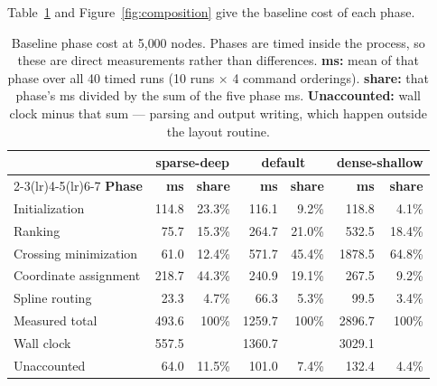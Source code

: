 Table~\ref{tab:composition} and Figure~\ref{fig:composition} give the baseline
cost of each phase.

\begin{table}[htbp]
\centering
\caption{Baseline phase cost at 5{,}000 nodes. Phases are timed inside the
process, so these are direct measurements rather than differences. \textbf{ms:}
mean of that phase over all 40 timed runs (10 runs $\times$ 4 command
orderings). \textbf{share:} that phase's ms divided by the sum of the five phase
ms. \textbf{Unaccounted:} wall clock minus that sum --- parsing and output
writing, which happen outside the layout routine.}
\label{tab:composition}
\begin{tabular}{lrrrrrr}
\toprule
& \multicolumn{2}{c}{\textbf{sparse-deep}} & \multicolumn{2}{c}{\textbf{default}} & \multicolumn{2}{c}{\textbf{dense-shallow}} \\
\cmidrule(lr){2-3}\cmidrule(lr){4-5}\cmidrule(lr){6-7}
\textbf{Phase} & \textbf{ms} & \textbf{share} & \textbf{ms} & \textbf{share} & \textbf{ms} & \textbf{share} \\
\midrule
Initialization        & 114.8  & 23.3\% & 116.1  & 9.2\%  & 118.8  & 4.1\%  \\
Ranking               & 75.7   & 15.3\% & 264.7  & 21.0\% & 532.5  & 18.4\% \\
Crossing minimization & 61.0   & 12.4\% & 571.7  & 45.4\% & 1878.5 & 64.8\% \\
Coordinate assignment & 218.7  & 44.3\% & 240.9  & 19.1\% & 267.5  & 9.2\%  \\
Spline routing        & 23.3   & 4.7\%  & 66.3   & 5.3\%  & 99.5   & 3.4\%  \\
\midrule
Measured total        & 493.6  & 100\%  & 1259.7 & 100\%  & 2896.7 & 100\%  \\
Wall clock            & 557.5  &        & 1360.7 &        & 3029.1 &        \\
Unaccounted           & 64.0   & 11.5\% & 101.0  & 7.4\%  & 132.4  & 4.4\%  \\
\bottomrule
\end{tabular}
\end{table}

